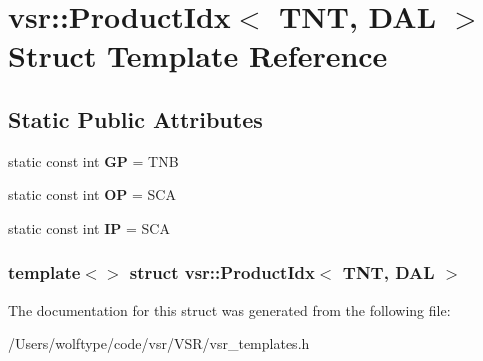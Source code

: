\hypertarget{structvsr_1_1_product_idx_3_01_t_n_t_00_01_d_a_l_01_4}{\section{vsr\-:\-:Product\-Idx$<$ T\-N\-T, D\-A\-L $>$ Struct Template Reference}
\label{structvsr_1_1_product_idx_3_01_t_n_t_00_01_d_a_l_01_4}
}
\subsection*{Static Public Attributes}
\begin{DoxyCompactItemize}
\item 
\hypertarget{structvsr_1_1_product_idx_3_01_t_n_t_00_01_d_a_l_01_4_a87a7baf02b4011c6425a76e77267db2a}{static const int {\bfseries G\-P} = T\-N\-B}\label{structvsr_1_1_product_idx_3_01_t_n_t_00_01_d_a_l_01_4_a87a7baf02b4011c6425a76e77267db2a}

\item 
\hypertarget{structvsr_1_1_product_idx_3_01_t_n_t_00_01_d_a_l_01_4_afe09cd7b50afede910bfd188419f4720}{static const int {\bfseries O\-P} = S\-C\-A}\label{structvsr_1_1_product_idx_3_01_t_n_t_00_01_d_a_l_01_4_afe09cd7b50afede910bfd188419f4720}

\item 
\hypertarget{structvsr_1_1_product_idx_3_01_t_n_t_00_01_d_a_l_01_4_af71340c9267c391b41dcda6b8272c5b0}{static const int {\bfseries I\-P} = S\-C\-A}\label{structvsr_1_1_product_idx_3_01_t_n_t_00_01_d_a_l_01_4_af71340c9267c391b41dcda6b8272c5b0}

\end{DoxyCompactItemize}
\subsubsection*{template$<$$>$ struct vsr\-::\-Product\-Idx$<$ T\-N\-T, D\-A\-L $>$}



The documentation for this struct was generated from the following file\-:\begin{DoxyCompactItemize}
\item 
/\-Users/wolftype/code/vsr/\-V\-S\-R/vsr\-\_\-templates.\-h\end{DoxyCompactItemize}
